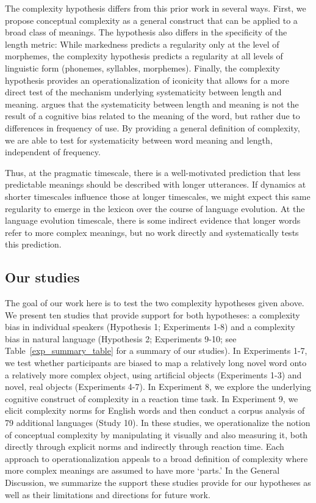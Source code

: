 The complexity hypothesis differs from this prior work in several ways.  First, we propose conceptual complexity as a general construct that can be applied to a broad class of meanings. The hypothesis also differs in the specificity of the length metric: While markedness predicts a regularity only at the level of morphemes, the complexity hypothesis predicts a regularity at all levels of linguistic form (phonemes, syllables, morphemes). Finally, the complexity hypothesis provides an operationalization of iconicity that allows for a more direct test of the mechanism underlying systematicity between length and meaning.   argues that the systematicity between length and meaning is not the result of a cognitive bias related to the meaning of the word, but rather due to differences in frequency of use. By providing a general definition of complexity, we are able to test for systematicity between word meaning and length, independent of frequency. 

Thus, at the pragmatic timescale, there is a well-motivated prediction that less predictable meanings should be described with longer utterances. If dynamics at shorter timescales influence those at longer timescales, we might expect this same regularity to emerge in the lexicon over the course of language evolution. At the language evolution timescale, there is some indirect evidence that longer words refer to more complex meanings, but no work directly and systematically tests this prediction.

\subsection{Our studies}

The goal of our work here is to test the two complexity hypotheses given above. We present ten studies that provide support for both hypotheses: a complexity bias in individual speakers (Hypothesis 1; Experiments 1-8) and a complexity bias in natural language (Hypothesis 2; Experiments 9-10; see Table~\ref{exp_summary_table} for a summary of our studies). In Experiments 1-7, we test whether participants are biased to map a relatively long novel word onto a relatively more complex object, using artificial objects (Experiments 1-3) and novel, real objects (Experiments 4-7). In Experiment 8, we explore the underlying cognitive construct of complexity in a reaction time task. In Experiment 9, we elicit complexity norms for English words and then conduct a corpus analysis of 79 additional languages (Study 10). In these studies, we operationalize the notion of conceptual complexity by manipulating it visually and also measuring it, both directly through explicit norms and indirectly through reaction time. Each approach to operationalization appeals to a broad definition of complexity where more complex meanings are assumed to have more `parts.' In the General Discussion, we  summarize the support these studies provide for our hypotheses as well as their limitations and directions for future work.

